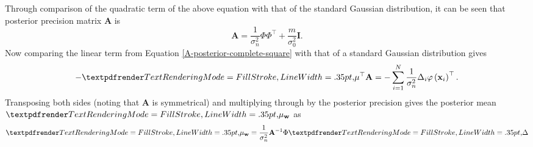 Through comparison of the quadratic term of the above equation with that of the standard Gaussian distribution, it can be seen that posterior precision matrix $\mathbf{A}$ is
\begin{equation}
    \mathbf{A}=\frac{1}{\sigma_{n}^{2}} \Phi \Phi^{\top} + \frac{m}{\sigma_{0}^2}\mathbf{I}.
\end{equation}
Now comparing the linear term from Equation \ref{A-posterior-complete-square} with that of a standard Gaussian distribution gives
\begin{equation}
    - \boldgreek{\mu}^{\top} \mathbf{A}=-\sum_{i=1}^{N}  \frac{1}{\sigma_{n}^{2}} \Delta_{i} \varphi\left(\mathbf{x}_{i}\right)^{\top}.
\end{equation}
Transposing both sides (noting that $\mathbf{A}$ is symmetrical) and multiplying through by the posterior precision gives the posterior mean $\boldgreek{\mu}_{\mathbf{w}}$ as
\begin{equation}
    \boldgreek{\mu}_{\mathbf{w}}=\frac{1}{\sigma_{n}^{2}}\mathbf{A}^{-1} \Phi \boldgreek{\Delta}
\end{equation}

